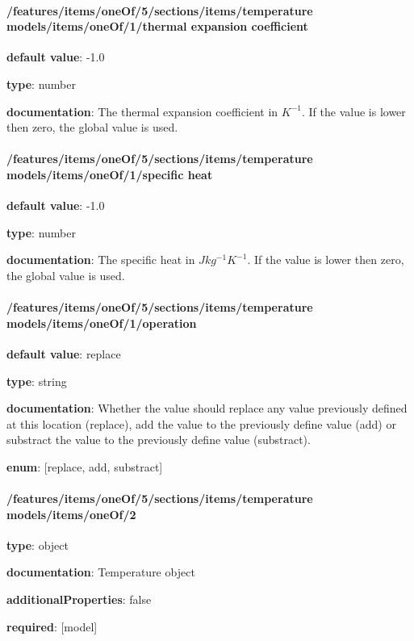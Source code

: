 \begin{itemized}
\end{itemized}\paragraph{/features/items/oneOf/5/sections/items/temperature models/items/oneOf/1/thermal expansion coefficient} \begin{itemized}
\item {\bf default value}: -1.0
\item {\bf type}: number
\item {\bf documentation}: The thermal expansion coefficient in $K^{-1}$. If the value is lower then zero, the global value is used.
\end{itemized}\paragraph{/features/items/oneOf/5/sections/items/temperature models/items/oneOf/1/specific heat} \begin{itemized}
\item {\bf default value}: -1.0
\item {\bf type}: number
\item {\bf documentation}: The specific heat in $J kg^{-1} K^{-1}$. If the value is lower then zero, the global value is used.
\end{itemized}\paragraph{/features/items/oneOf/5/sections/items/temperature models/items/oneOf/1/operation} \begin{itemized}
\item {\bf default value}: replace
\item {\bf type}: string
\item {\bf documentation}: Whether the value should replace any value previously defined at this location (replace), add the value to the previously define value (add) or substract the value to the previously define value (substract).
\item {\bf enum}: [replace, add, substract]\end{itemized}\paragraph{/features/items/oneOf/5/sections/items/temperature models/items/oneOf/2} \begin{itemized}
\item {\bf type}: object
\item {\bf documentation}: Temperature object
\item {\bf additionalProperties}: false
\item {\bf required}: [model]\end{itemized}
